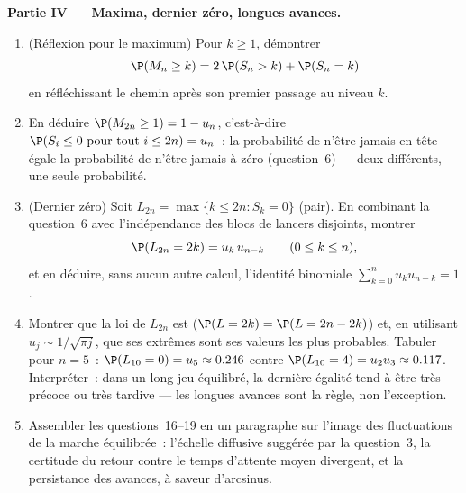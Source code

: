 \begin{problem}
\medskip
\noindent\textbf{Partie IV --- Maxima, dernier zéro, longues avances.}
\begin{enumerate}[resume]
  \item (Réflexion pour le maximum) Pour $k \geq 1$, démontrer
        \[
        \P(M_n \geq k) = 2\,\P(S_n > k) + \P(S_n = k)
        \]
        en réfléchissant le chemin après son premier passage au
        niveau $k$.
  \item En déduire $\P(M_{2n} \geq 1) = 1 - u_n$, c'est-à-dire
        $\P(S_i \leq 0 \text{ pour tout } i \leq 2n) = u_n$~:
        la probabilité de n'être jamais en tête égale la
        probabilité de n'être jamais à zéro (question~6) ---
        deux  différents, une seule probabilité.
  \item (Dernier zéro) Soit $L_{2n} = \max\{k \leq 2n : S_k =
        0\}$ (pair). En combinant la question~6 avec l'indépendance
        des blocs de lancers disjoints, montrer
        \[
        \P(L_{2n} = 2k) = u_k\,u_{n-k}
        \qquad (0 \leq k \leq n),
        \]
        et en déduire, sans aucun autre calcul, l'identité
        binomiale $\sum_{k=0}^n u_ku_{n-k} = 1$.
  \item Montrer que la loi de $L_{2n}$ est  ($\P(L =
        2k) = \P(L = 2n - 2k)$) et, en utilisant $u_j \sim
        1/\sqrt{\pi j}$, que ses extrêmes sont ses valeurs les
        plus probables. Tabuler pour $n = 5$~: $\P(L_{10} = 0)
        = u_5 \approx 0.246$ contre $\P(L_{10} = 4) = u_2u_3
        \approx 0.117$. Interpréter~: dans un long jeu équilibré, la
        dernière égalité tend à être très précoce ou très tardive ---
        les longues avances sont la règle, non l'exception.
  \item Assembler les questions~16--19 en un paragraphe sur l'image
        des fluctuations de la marche équilibrée~: l'échelle diffusive
        suggérée par la question~3, la certitude du
        retour contre le temps d'attente moyen divergent, et
        la persistance des avances, à saveur d'arcsinus.
\end{enumerate}


\end{problem}
